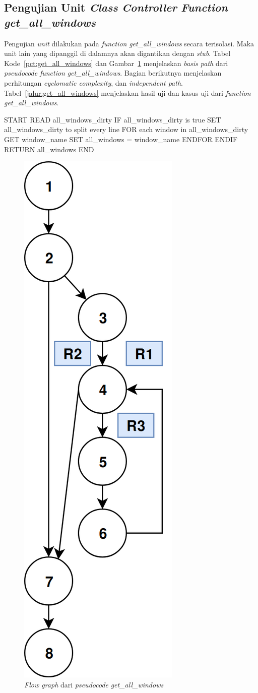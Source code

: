 \subsection{Pengujian Unit \emph{Class} \emph{Controller} \emph{Function} \emph{get\_all\_windows}}

Pengujian \emph{unit} dilakukan pada \emph{function}
\emph{get\_all\_windows} secara terisolasi. Maka unit lain
yang dipanggil di dalamnya akan digantikan dengan \emph{stub}.
Tabel Kode~\ref{pct:get_all_windows} dan Gambar~\ref{fg:get_all_windows}
menjelaskan \emph{basis path} dari \emph{pseudocode}
\emph{function} \emph{get\_all\_windows}. Bagian berikutnya menjelaskan
perhitungan \emph{cyclomatic complexity}, dan \emph{independent path}.
Tabel~\ref{jalur:get_all_windows} menjelaskan hasil uji dan kasus uji
dari \emph{function} \emph{get\_all\_windows}.

\par\null\par
\begin{code}
\begin{ignasicblock}[title=get\_all\_windows,minted language=text,
underlay={
  \drawline{8cm}{11.5cm}{2.5}{1}
  \drawline{8cm}{12.5cm}{3.5}{2}
  \drawline{12cm}{11.5cm}{5}{3}
  \drawline{10cm}{12.5cm}{6}{4}
  \drawbrace{12cm}{6.5}{8.5}{5}
  \drawline{8cm}{11.5cm}{10}{6}
  \drawline{8cm}{12.5cm}{11}{7}
  \drawline{8cm}{11.5cm}{12.5}{8}
 }]

START
  READ all_windows_dirty
  IF all_windows_dirty is true
    SET all_windows_dirty to split every line
    FOR each window in all_windows_dirty
      GET window_name
      SET all_windows = window_name
    ENDFOR
  ENDIF
  RETURN all_windows
END
\end{ignasicblock}
  \label{pct:get_all_windows}
\end{code}

\begin{figure}[H]
  \centering
  \includegraphics[width=.19\linewidth]{img/test-case/fg-get_all_windows-v2}
  \caption{\emph{Flow graph} dari \emph{pseudocode}
    \emph{get\_all\_windows}}\label{fg:get_all_windows}
\end{figure}


